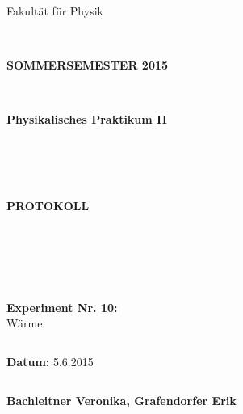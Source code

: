 \documentclass[12pt,a4paper,twopage]{article}
\begin{document}
\thispagestyle{empty}
			\begin{center}
			\Large{Fakultät für Physik}\\
			\end{center}
\begin{verbatim}


\end{verbatim}
			\begin{center}
			\textbf{\LARGE SOMMERSEMESTER 2015}
			\end{center}
\begin{verbatim}


\end{verbatim}
			\begin{center}
			\textbf{\LARGE{Physikalisches Praktikum II}}
			\end{center}
\begin{verbatim}




\end{verbatim}

			\begin{center}
			\textbf{\LARGE{PROTOKOLL}}
			\end{center}
			
\begin{verbatim}





\end{verbatim}

			\begin{flushleft}
			\textbf{\Large{Experiment Nr. 10:}}\\
			
			\LARGE{Wärme}	
			\end{flushleft}

\begin{verbatim}

\end{verbatim}	
			\begin{flushleft}
			\textbf{\Large{Datum:}} \Large{5.6.2015}
			\end{flushleft}
			
\begin{verbatim}
\end{verbatim}
		\begin{flushleft}
			\textbf{\Large{Bachleitner Veronika, Grafendorfer Erik}} 
			\end{flushleft}
\end{document}
